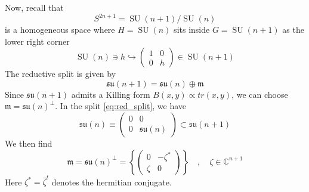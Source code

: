 \documentclass[a4paper,11pt]{article}
\theoremstyle{definition}
\newcommand{\CC}{\mathbb{C}}
\DeclareMathOperator{\SU}{SU}
\newcommand{\m}{\mathfrak{m}}
\newcommand{\su}{\mathfrak{su}}
\newcommand{\mat}[4]{\begin{pmatrix} #1 & #2 \\ #3 & #4 \end{pmatrix}}
\begin{document}
Now, recall that 
\begin{equation}
  S^{2n + 1} = \SU(n+1) / \SU(n)
\end{equation}
is a homogeneous space where $H = \SU(n)$ sits inside $G = \SU(n+1)$ as the lower right corner
\begin{equation}
  \SU(n) \ni h \hookrightarrow \mat{1}{0}{0}{h} \in \SU(n+1)
\end{equation}
The reductive split is given by 
\begin{equation}
  \su(n+1) = \su(n) \oplus \m
  \label{eq:red_split}
\end{equation}
Since $\su(n+1)$ admits a Killing form $B(x,y) \propto tr(x,y)$, we can choose $\m = \su(n)^{\perp}$.
In the split \eqref{eq:red_split}, we have 
\begin{equation}
  \su(n) \equiv \mat{0}{0}{0}{\su(n)} \subset \su(n+1)
\end{equation}
We then find 
\begin{equation}
  \m = \su(n)^{\perp} = \left\{ \mat{0}{-\zeta^*}{\zeta}{0} \right\} \quad , \quad \zeta \in \CC^{n+1}
\end{equation}
Here $\zeta^* = \bar \zeta^t$ denotes the hermitian conjugate. 
\end{document}
